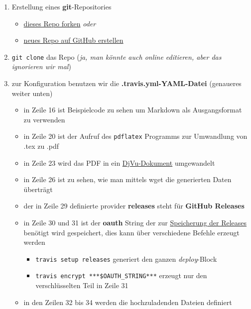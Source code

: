 \documentclass[10pt,a4paper]{article}
\providecommand{\tightlist}{
  \setlength{\itemsep}{0pt}\setlength{\parskip}{0pt}}
\begin{document}
\begin{enumerate}
\def\labelenumi{\arabic{enumi}.}
\tightlist
\item
  Erstellung eines \textbf{git}-Repositories

\begin{itemize}
\tightlist
\item
  \href{https://github.com/SimonWaldherr/golang-examples\#fork-destination-box}{dieses
  Repo forken} \emph{oder}
\item
  \href{https://github.com/new}{neues Repo auf GitHub erstellen}
\end{itemize}

\item
  \texttt{git\ clone} das Repo (\emph{ja, man könnte auch online
  editieren, aber das ignorieren wir mal})
\item
  zur Konfiguration benutzen wir die \textbf{.travis.yml-YAML-Datei}
  (genaueres weiter unten)

\begin{itemize}
\tightlist
\item
  in Zeile 16 ist Beispielcode zu sehen um Markdown als Ausgangsformat
  zu verwenden
\item
  in Zeile 20 ist der Aufruf des \texttt{pdflatex} Programms zur
  Umwandlung von .tex zu .pdf
\item
  in Zeile 23 wird das PDF in ein
  \href{https://de.wikipedia.org/wiki/DjVu}{DjVu-Dokument} umgewandelt
\item
  in Zeile 26 ist zu sehen, wie man mittels wget die generierten Daten
  überträgt
\item
  der in Zeile 29 definierte provider \textbf{releases} steht für
  \textbf{GitHub Releases}
\item
  in Zeile 30 und 31 ist der \textbf{oauth} String der zur
  \href{http://docs.travis-ci.com/user/deployment/releases/}{Speicherung
  der Releases} benötigt wird gespeichert, dies kann über verschiedene
  Befehle erzeugt werden

  \begin{itemize}
  \tightlist
  \item
    \texttt{travis\ setup\ releases} generiert den ganzen
    \emph{deploy}-Block
  \item
    \texttt{travis\ encrypt\ ***\$OAUTH\_STRING***} erzeugt nur den
    verschlüsselten Teil in Zeile 31
  \end{itemize}
\item
  in den Zeilen 32 bis 34 werden die hochzuladenden Dateien definiert
\end{itemize}


\end{enumerate}
\end{document}
